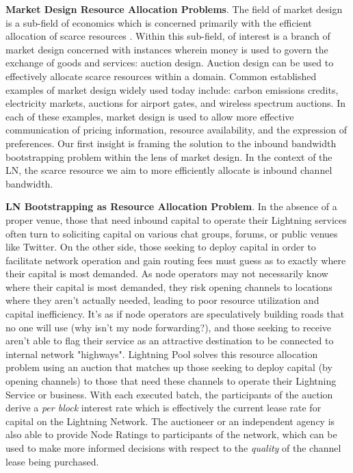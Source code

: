 \documentclass[10pt,a4paper]{article}
\theoremstyle{definition}
\begin{document}
\textbf{Market Design Resource Allocation Problems}. The field of market design
is a sub-field of economics which is concerned primarily with the efficient
allocation of scarce resources \cite{cramton2010} . Within this sub-field, of
interest is a branch of market design concerned with instances wherein money is
used to govern the exchange of goods and services: auction design.
Auction design can be used to effectively allocate scarce resources within a
domain.  Common established examples of market design widely used today
include: carbon emissions credits, electricity markets, auctions for airport
gates, and wireless spectrum auctions. In each of these examples, market design
is used to allow more effective communication of pricing information, resource
availability, and the expression of preferences.  Our first insight is framing
the solution to the inbound bandwidth bootstrapping problem within the lens of
market design. In the context of the LN, the scarce resource we aim to more
efficiently allocate is inbound channel bandwidth.

\textbf{LN Bootstrapping as Resource Allocation Problem}. In the absence of a
proper venue, those that need inbound capital to operate their Lightning
services often turn to soliciting capital on various chat groups, forums, or
public venues like Twitter. On the other side, those seeking to deploy capital
in order to facilitate network operation and gain routing fees must guess as to
exactly where their capital is most demanded. As node operators may not
necessarily know where their capital is most demanded, they risk opening
channels to locations where they aren't actually needed, leading to poor
resource utilization and capital inefficiency. It's as if node operators are
speculatively building roads that no one will use (why isn't my node
forwarding?), and those seeking to receive aren't able to flag their service as
an attractive destination to be connected to internal network "highways".
Lightning Pool solves this resource allocation problem using an auction that
matches up those seeking to deploy capital (by opening channels) to those that
need these channels to operate their Lightning Service or business. With each
executed batch, the participants of the auction derive a \emph{per block}
interest rate which is effectively the current lease rate for capital on the
Lightning Network. The auctioneer or an independent agency is also able to
provide Node Ratings to participants of the network, which can be used to make
more informed decisions with respect to the \emph{quality} of the channel lease
being purchased. 
\end{document}
